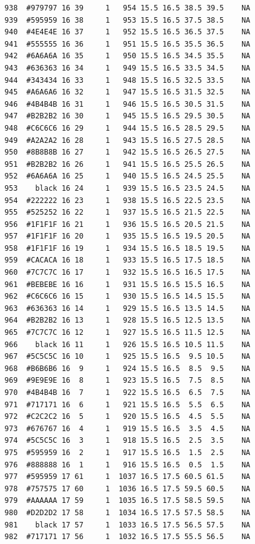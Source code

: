\documentclass[12pt,twoside]{reedthesis}
\begin{document}
\begin{verbatim}
  938  #979797 16 39     1   954 15.5 16.5 38.5 39.5    NA
  939  #595959 16 38     1   953 15.5 16.5 37.5 38.5    NA
  940  #4E4E4E 16 37     1   952 15.5 16.5 36.5 37.5    NA
  941  #555555 16 36     1   951 15.5 16.5 35.5 36.5    NA
  942  #6A6A6A 16 35     1   950 15.5 16.5 34.5 35.5    NA
  943  #636363 16 34     1   949 15.5 16.5 33.5 34.5    NA
  944  #343434 16 33     1   948 15.5 16.5 32.5 33.5    NA
  945  #A6A6A6 16 32     1   947 15.5 16.5 31.5 32.5    NA
  946  #4B4B4B 16 31     1   946 15.5 16.5 30.5 31.5    NA
  947  #B2B2B2 16 30     1   945 15.5 16.5 29.5 30.5    NA
  948  #C6C6C6 16 29     1   944 15.5 16.5 28.5 29.5    NA
  949  #A2A2A2 16 28     1   943 15.5 16.5 27.5 28.5    NA
  950  #8B8B8B 16 27     1   942 15.5 16.5 26.5 27.5    NA
  951  #B2B2B2 16 26     1   941 15.5 16.5 25.5 26.5    NA
  952  #6A6A6A 16 25     1   940 15.5 16.5 24.5 25.5    NA
  953    black 16 24     1   939 15.5 16.5 23.5 24.5    NA
  954  #222222 16 23     1   938 15.5 16.5 22.5 23.5    NA
  955  #525252 16 22     1   937 15.5 16.5 21.5 22.5    NA
  956  #1F1F1F 16 21     1   936 15.5 16.5 20.5 21.5    NA
  957  #1F1F1F 16 20     1   935 15.5 16.5 19.5 20.5    NA
  958  #1F1F1F 16 19     1   934 15.5 16.5 18.5 19.5    NA
  959  #CACACA 16 18     1   933 15.5 16.5 17.5 18.5    NA
  960  #7C7C7C 16 17     1   932 15.5 16.5 16.5 17.5    NA
  961  #BEBEBE 16 16     1   931 15.5 16.5 15.5 16.5    NA
  962  #C6C6C6 16 15     1   930 15.5 16.5 14.5 15.5    NA
  963  #636363 16 14     1   929 15.5 16.5 13.5 14.5    NA
  964  #B2B2B2 16 13     1   928 15.5 16.5 12.5 13.5    NA
  965  #7C7C7C 16 12     1   927 15.5 16.5 11.5 12.5    NA
  966    black 16 11     1   926 15.5 16.5 10.5 11.5    NA
  967  #5C5C5C 16 10     1   925 15.5 16.5  9.5 10.5    NA
  968  #B6B6B6 16  9     1   924 15.5 16.5  8.5  9.5    NA
  969  #9E9E9E 16  8     1   923 15.5 16.5  7.5  8.5    NA
  970  #4B4B4B 16  7     1   922 15.5 16.5  6.5  7.5    NA
  971  #717171 16  6     1   921 15.5 16.5  5.5  6.5    NA
  972  #C2C2C2 16  5     1   920 15.5 16.5  4.5  5.5    NA
  973  #676767 16  4     1   919 15.5 16.5  3.5  4.5    NA
  974  #5C5C5C 16  3     1   918 15.5 16.5  2.5  3.5    NA
  975  #595959 16  2     1   917 15.5 16.5  1.5  2.5    NA
  976  #888888 16  1     1   916 15.5 16.5  0.5  1.5    NA
  977  #595959 17 61     1  1037 16.5 17.5 60.5 61.5    NA
  978  #757575 17 60     1  1036 16.5 17.5 59.5 60.5    NA
  979  #AAAAAA 17 59     1  1035 16.5 17.5 58.5 59.5    NA
  980  #D2D2D2 17 58     1  1034 16.5 17.5 57.5 58.5    NA
  981    black 17 57     1  1033 16.5 17.5 56.5 57.5    NA
  982  #717171 17 56     1  1032 16.5 17.5 55.5 56.5    NA

\end{verbatim}
\end{document}
